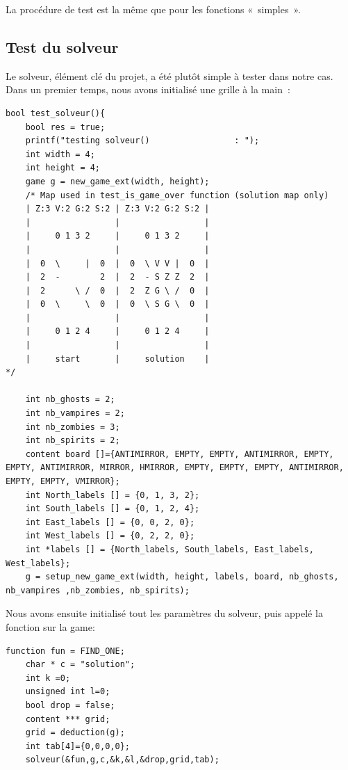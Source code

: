 \documentclass[12]{article}
\begin{document}
La procédure de test est la même que pour les fonctions « simples ».

\subsection{Test du solveur}

Le solveur, élément clé du projet, a été plutôt simple à tester dans notre cas. Dans un premier temps, nous avons initialisé une grille à la main :

\begin{lstlisting}[style=CStyle]
bool test_solveur(){
    bool res = true;
    printf("testing solveur()    	          : ");
    int width = 4;
    int height = 4;
    game g = new_game_ext(width, height);
    /* Map used in test_is_game_over function (solution map only)
    | Z:3 V:2 G:2 S:2 | Z:3 V:2 G:2 S:2 |
    |                 |                 |
    |     0 1 3 2     |     0 1 3 2     |
    |                 |                 |
    |  0  \     |  0  |  0  \ V V |  0  |
    |  2  -        2  |  2  - S Z Z  2  |
    |  2      \ /  0  |  2  Z G \ /  0  |
    |  0  \     \  0  |  0  \ S G \  0  |
    |                 |                 |
    |     0 1 2 4     |     0 1 2 4     |
    |                 |                 |
    |     start       |     solution    |
*/

    int nb_ghosts = 2;
    int nb_vampires = 2;
    int nb_zombies = 3;
    int nb_spirits = 2;
    content board []={ANTIMIRROR, EMPTY, EMPTY, ANTIMIRROR, EMPTY, EMPTY, ANTIMIRROR, MIRROR, HMIRROR, EMPTY, EMPTY, EMPTY, ANTIMIRROR, EMPTY, EMPTY, VMIRROR};
    int North_labels [] = {0, 1, 3, 2};
    int South_labels [] = {0, 1, 2, 4};
    int East_labels [] = {0, 0, 2, 0};
    int West_labels [] = {0, 2, 2, 0};
    int *labels [] = {North_labels, South_labels, East_labels, West_labels};
    g = setup_new_game_ext(width, height, labels, board, nb_ghosts, nb_vampires ,nb_zombies, nb_spirits);
\end{lstlisting}

Nous avons ensuite initialisé tout les paramètres du solveur, puis appelé la fonction sur la game:

\begin{lstlisting}[style=CStyle]
    function fun = FIND_ONE;
    char * c = "solution";
    int k =0;
    unsigned int l=0;
    bool drop = false;
    content *** grid;
    grid = deduction(g);
    int tab[4]={0,0,0,0};
    solveur(&fun,g,c,&k,&l,&drop,grid,tab);
\end{lstlisting}
       
\end{document}
